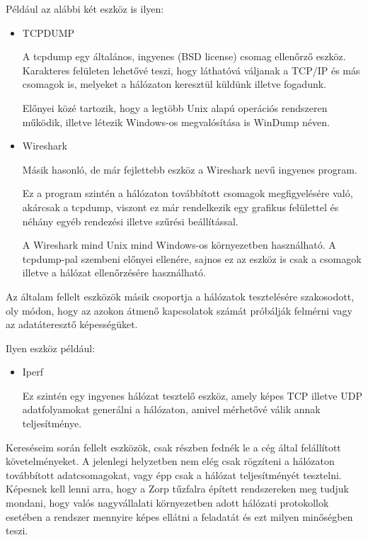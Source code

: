 \documentclass[a4paper,12pt,oneside]{report}
\begin{document}
Például az alábbi két eszköz is ilyen:
\begin{itemize}
	\item TCPDUMP \cite{website:tcpdump}
		
		A tcpdump egy általános, ingyenes (BSD license) csomag ellenőrző eszköz. Karakteres felületen lehetővé teszi, hogy láthatóvá váljanak a TCP/IP és más csomagok is, melyeket a hálózaton keresztül küldünk illetve fogadunk.
		
		Előnyei közé tartozik, hogy a legtöbb Unix alapú operációs rendszeren működik, illetve létezik Windows-os megvalósítása is WinDump néven.

	\item Wireshark \cite{website:wireshark}
		
Másik hasonló, de már fejlettebb eszköz a Wireshark nevű ingyenes program.

Ez a program szintén a hálózaton továbbított csomagok megfigyelésére való, akárcsak a tcpdump, viszont ez már rendelkezik egy grafikus felülettel és néhány egyéb rendezési illetve szűrési beállítással.

A Wireshark mind Unix mind Windows-os környezetben használható.
A tcpdump-pal szembeni előnyei ellenére, sajnos ez az eszköz is csak a csomagok illetve a hálózat ellenőrzésére használható.
		
\end{itemize}

Az általam fellelt eszközök másik csoportja a hálózatok tesztelésére szakosodott, oly módon,
hogy az azokon átmenő kapcsolatok számát próbálják felmérni vagy az adatáteresztő képességüket.

Ilyen eszköz például:
\begin{itemize}
\item Iperf \cite{website:iperf}

Ez szintén egy ingyenes hálózat tesztelő eszköz, amely képes TCP illetve UDP adatfolyamokat generálni a hálózaton, amivel mérhetővé válik annak teljesítménye.
\end{itemize}

Kereséseim során fellelt eszközök, csak részben fednék le a cég által felállított követelményeket.
A jelenlegi helyzetben nem elég csak rögzíteni a hálózaton továbbított adatcsomagokat, vagy épp csak a hálózat teljesítményét tesztelni.
Képesnek kell lenni arra, hogy a Zorp tűzfalra épített rendszereken meg tudjuk mondani, hogy valós nagyvállalati környezetben adott hálózati protokollok esetében a rendszer mennyire képes ellátni a feladatát és ezt milyen minőségben teszi.
\end{document}
